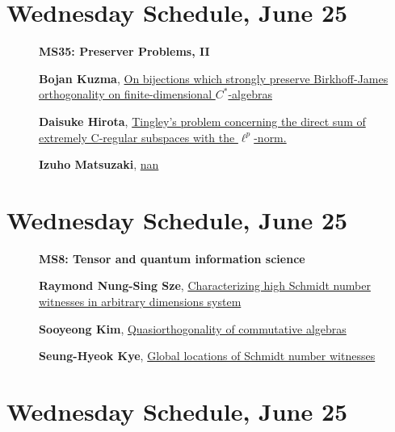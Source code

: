 \documentclass[ILAS2025-program.tex]{subfiles}
\begin{document}
\section*{Wednesday Schedule, June 25 }
        
        \begin{description}
    \item[] {\color{mstitle}\textbf{MS35: Preserver Problems, II}} 
    \item[] \hypertarget{up0247}{}\textbf{Bojan Kuzma}, \hyperlink{down0247}{On bijections which strongly preserve Birkhoff-James orthogonality on finite-dimensional $C^*$-algebras}
        \item[] \hypertarget{up0248}{}\textbf{Daisuke Hirota}, \hyperlink{down0248}{Tingley's problem concerning the direct sum of extremely C-regular subspaces with the $\ell^p$-norm.}
        \item[] \hypertarget{up0249}{}\textbf{Izuho Matsuzaki}, \hyperlink{down0249}{nan}
        \end{description}
    \newpage

\section*{Wednesday Schedule, June 25 }
        
        \begin{description}
    \item[] {\color{mstitle}\textbf{MS8: Tensor and quantum information science}} 
    \item[] \hypertarget{up0250}{}\textbf{Raymond Nung-Sing Sze}, \hyperlink{down0250}{Characterizing high Schmidt number witnesses in arbitrary dimensions system
}
        \item[] \hypertarget{up0251}{}\textbf{Sooyeong Kim}, \hyperlink{down0251}{Quasiorthogonality of commutative algebras
}
        \item[] \hypertarget{up0252}{}\textbf{Seung-Hyeok Kye}, \hyperlink{down0252}{Global locations of Schmidt number witnesses
}
        \end{description}
    \newpage

\section*{Wednesday Schedule, June 25 }
        
\end{document}
